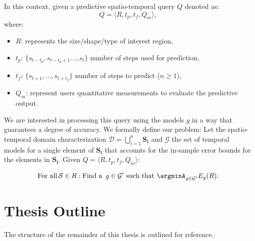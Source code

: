 In this context, given a predictive spatio-temporal query $Q$ denoted as:
\begin{equation} \label{eq:predictivequery}
Q = \langle R, t_{p}, t_{f}, Q_{m} \rangle,
\end{equation}
where:
\begin{itemize}[noitemsep,nolistsep]	
	\item $R$: represents the size/shape/type of interest region,
	\item $t_{p}$: $\{s_{t-t_p}, s_{t-t_{p}+1}\ldots, s_{t}\}$ number of steps used for  prediction,
	\item $t_{f}$: $\{s_{t+1}, \ldots, s_{t+t_f}\}$ number of steps to predict ($n\geq 1$),
	\item $Q_{m}$: represent users quantitative measurements to evaluate the predictive output.
\end{itemize}
We are interested in processing this query using the models $g$ in a way that guarantees a degree of accuracy. We formally define our problem: Let the spatio-temporal domain characterization $\mathcal{D} = \bigcup_{i=1}^{n} \mathbf{S_i}$ and $\mathcal{G}$ the set of temporal models for a single element of $\mathbf{S_i}$ that accounts for the in-sample error bounds for the elements in $\mathbf{S_i}$. Given $Q = \langle R, t_{p}, t_{f}, Q_{m} \rangle$:

\begin{equation}
\textrm{For all}\, \mathcal{S} \in R: \textrm{Find a\, } g \in \mathcal{G'} \,\,\textrm{such that} \,\, \argminA_{g\in\mathcal{G'}} E_{g}(R).
\end{equation}



\section{Thesis Outline}
\label{Sec:ThesisOutline}

The structure of the remainder of this thesis is outlined for reference.

